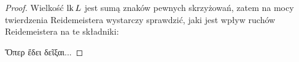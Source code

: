 \begin{proof}
    Wielkość $\operatorname{lk} L$ jest sumą znaków pewnych skrzyżowań, zatem na mocy twierdzenia Reidemeistera wystarczy sprawdzić, jaki jest wpływ ruchów Reidemeistera na te składniki:

\noindent
    Ὅπερ ἔδει δεῖξαι...
\end{proof}

%



